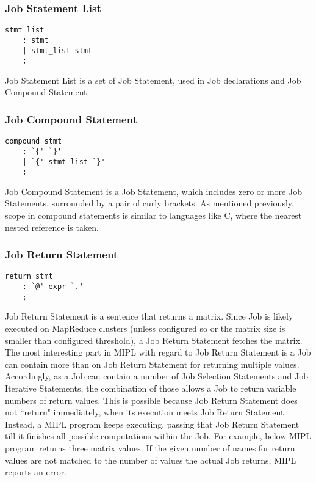 \documentclass[prodmode,acmtecs]{acmsmall}
\begin{document}
\subsubsection{Job Statement List}

\begin{lstlisting}
stmt_list
	: stmt
	| stmt_list stmt
	;
\end{lstlisting}

Job Statement List is a set of Job Statement, used in Job
declarations and Job Compound Statement.
\medskip


\subsubsection{Job Compound Statement}

\begin{lstlisting}
compound_stmt
	: `{' `}'
	| `{' stmt_list `}'
	;
\end{lstlisting}

Job Compound Statement is a Job Statement, which includes
zero or more Job Statements, surrounded by a pair of curly
brackets. As mentioned previously, scope in compound statements
is similar to languages like C, where the nearest nested reference 
is taken.
\medskip

\subsubsection{Job Return Statement}

\begin{lstlisting}
return_stmt
	: `@' expr `.'
	;

\end{lstlisting}

Job Return Statement is a sentence that returns a matrix.  Since
Job is likely executed on MapReduce clusters (unless configured
so or the matrix size is smaller than configured threshold), a Job
Return Statement fetches the matrix.  The most interesting part
in MIPL with regard to Job Return Statement is a Job can contain
more than on Job Return Statement for returning multiple values. 
Accordingly, as a Job can contain a number of Job Selection
Statements and Job Iterative Statements, the combination of those
allows a Job to return variable numbers of return values. This is
possible because Job Return Statement does not ``return" immediately,
when its execution meets Job Return Statement.  Instead, a
MIPL program keeps executing, passing that Job Return Statement till
it finishes all possible computations within the Job.
For example, below MIPL program returns three matrix values.  If
the given number of names for return values are not matched to the
number of values the actual Job returns, MIPL reports an error.
\end{document}
